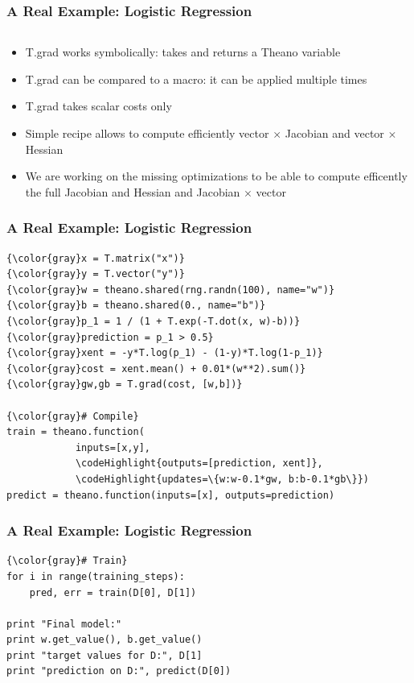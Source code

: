 \documentclass[a4paper,9pt]{beamer}
\begin{document}
\begin{frame}[fragile]
  \frametitle{A Real Example: Logistic Regression}
\begin{Verbatim}[commandchars=\\\{\}]

\end{Verbatim}
\begin{itemize}
\item T.grad works symbolically: takes and returns a Theano variable
\item T.grad can be compared to a macro: it can be applied multiple times
\item T.grad takes scalar costs only
\item Simple recipe allows to compute efficiently vector $\times$ Jacobian and vector $\times$ Hessian
\item We are working on the missing optimizations to be able to compute efficently the full Jacobian and Hessian and Jacobian $\times$ vector
\end{itemize}
\end{frame}

\begin{frame}[fragile]
  \frametitle{A Real Example: Logistic Regression}
\begin{Verbatim}[commandchars=\\\{\}]
{\color{gray}x = T.matrix("x")}
{\color{gray}y = T.vector("y")}
{\color{gray}w = theano.shared(rng.randn(100), name="w")}
{\color{gray}b = theano.shared(0., name="b")}
{\color{gray}p_1 = 1 / (1 + T.exp(-T.dot(x, w)-b))}
{\color{gray}prediction = p_1 > 0.5}
{\color{gray}xent = -y*T.log(p_1) - (1-y)*T.log(1-p_1)}
{\color{gray}cost = xent.mean() + 0.01*(w**2).sum()}
{\color{gray}gw,gb = T.grad(cost, [w,b])}

{\color{gray}# Compile}
train = theano.function(
            inputs=[x,y],
            \codeHighlight{outputs=[prediction, xent]},
            \codeHighlight{updates=\{w:w-0.1*gw, b:b-0.1*gb\}})
predict = theano.function(inputs=[x], outputs=prediction)
\end{Verbatim}
\end{frame}

\begin{frame}[fragile]
  \frametitle{A Real Example: Logistic Regression}
\begin{Verbatim}[commandchars=\\\{\}]
{\color{gray}# Train}
for i in range(training_steps):
    pred, err = train(D[0], D[1])

print "Final model:"
print w.get_value(), b.get_value()
print "target values for D:", D[1]
print "prediction on D:", predict(D[0])
\end{Verbatim}
\end{frame}
\end{document}
